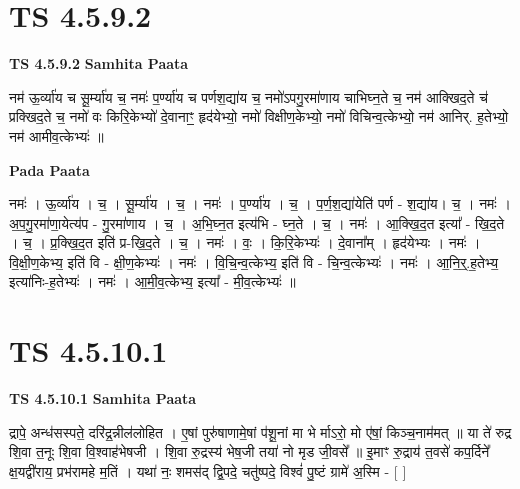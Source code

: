 \documentclass[17pt]{extarticle}
\begin{document}

\section{ TS 4.5.9.2 }

\textbf{TS 4.5.9.2 } \newline
\textbf{Samhita Paata} \newline

नम॑ ऊ॒र्व्या॑य च सू॒र्म्या॑य च॒ नमः॑ प॒र्ण्या॑य च पर्णश॒द्या॑य च॒ नमो॑ऽपगु॒रमा॑णाय चाभिघ्न॒ते च॒ नम॑ आक्खिद॒ते च॑ प्रक्खिद॒ते च॒ नमो॑ वः किरि॒केभ्यो॑ दे॒वानाꣳ॒॒ हृद॑येभ्यो॒ नमो॑ विक्षीण॒केभ्यो॒ नमो॑ विचिन्व॒त्केभ्यो॒ नम॑ आनिर्. ह॒तेभ्यो॒ नम॑ आमीव॒त्केभ्यः॑ ॥ \newline

\textbf{Pada Paata} \newline

नमः॑ । ऊ॒र्व्या॑य । च॒ । सू॒र्म्या॑य । च॒ । नमः॑ । प॒र्ण्या॑य । च॒ । प॒र्ण॒श॒द्या॑येति॑ पर्ण - श॒द्या॑य। च॒ । नमः॑ । अ॒प॒गु॒रमा॑णा॒येत्य॑प - गु॒रमा॑णाय । च॒ । अ॒भि॒घ्न॒त इत्य॑भि - घ्न॒ते । च॒ । नमः॑ । आ॒क्खि॒द॒त इत्या᳚ - खि॒द॒ते । च॒ । प्र॒क्खि॒द॒त इति॑ प्र-खि॒द॒ते । च॒ । नमः॑ । वः॒ । कि॒रि॒केभ्यः॑ । दे॒वाना᳚म् । हृद॑येभ्यः । नमः॑ । वि॒क्षी॒ण॒केभ्य॒ इति॑ वि - क्षी॒ण॒केभ्यः॑ । नमः॑ । वि॒चि॒न्व॒त्केभ्य॒ इति॑ वि - चि॒न्व॒त्केभ्यः॑ । नमः॑ । आ॒नि॒र्॒.ह॒तेभ्य॒ इत्या॑निः-ह॒तेभ्यः॑ । नमः॑ । आ॒मी॒व॒त्केभ्य॒ इत्या᳚ - मी॒व॒त्केभ्यः॑ ॥  \newline





\section{ TS 4.5.10.1 }

\textbf{TS 4.5.10.1 } \newline
\textbf{Samhita Paata} \newline

द्रापे॒ अन्ध॑सस्पते॒ दरि॑द्र॒न्नील॑लोहित । ए॒षां पुरु॑षाणामे॒षां प॑शू॒नां मा भे र्माऽरो॒ मो ए॑षां॒ किञ्च॒नाम॑मत् ॥ या ते॑ रुद्र शि॒वा त॒नूः शि॒वा वि॒श्वाह॑भेषजी । शि॒वा रु॒द्रस्य॑ भेष॒जी तया॑ नो मृड जी॒वसे᳚ ॥                                    इ॒माꣳ रु॒द्राय॑ त॒वसे॑ कप॒र्दिने᳚ क्ष॒यद्वी॑राय॒ प्रभ॑रामहे म॒तिं । यथा॑ नः॒ शमस॑द् द्वि॒पदे॒ चतु॑ष्पदे॒ विश्वं॑ पु॒ष्टं ग्रामे॑ अ॒स्मि - [  ] \newline
\end{document}
